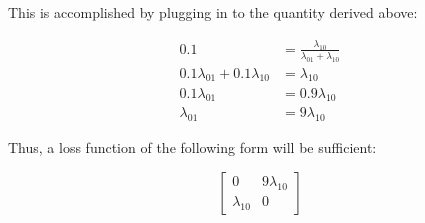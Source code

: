 {This is accomplished by plugging in to the quantity derived above:

\begin{align}
    0.1 & = \frac{\lambda_{10}}{\lambda_{01} + \lambda_{10}} \\
    0.1\lambda_{01} + 0.1\lambda_{10} & = \lambda_{10} \\
    0.1\lambda_{01} & = 0.9\lambda_{10} \\
    \lambda_{01} & = 9\lambda_{10}
\end{align}

Thus, a loss function of the following form will be sufficient:

$$\begin{bmatrix}0 & 9\lambda_{10} \\ \lambda_{10} & 0 \end{bmatrix}$$

}

